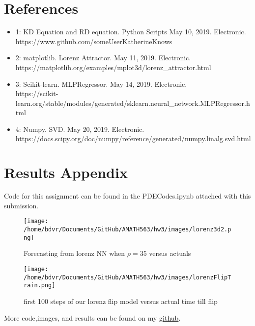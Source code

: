 \documentclass[12pt]{article}
\begin{document}
	\section{References}
	\begin{itemize}
		\item 1: KD Equation and RD equation. Python Scripts May 10, 2019. Electronic. \\
		https://www.github.com/someUserKatherineKnows
		\item 2: matplotlib. Lorenz Attractor. May 11, 2019. Electronic.\\ 
		https://matplotlib.org/examples/mplot3d/lorenz\_attractor.html
		\item 3: Scikit-learn. MLPRegressor. May 14, 2019. Electronic.\\  https://scikit-learn.org/stable/modules/generated/sklearn.neural\_network.MLPRegressor.html
		\item 4: Numpy. SVD. May 20, 2019. Electronic.\\ https://docs.scipy.org/doc/numpy/reference/generated/numpy.linalg.svd.html
		
	\end{itemize}
	\section{Results Appendix}
	Code for this assignment can be found in the PDECodes.ipynb attached with this submission.
	
	\begin{figure}[H]
		\texttt{[image: /home/bdvr/Documents/GitHub/AMATH563/hw3/images/lorenz3d2.png]}
		\caption{Forecasting from lorenz NN when $\rho=35$ versus actuals}
	\end{figure}
	\begin{figure}[H]
		\texttt{[image: /home/bdvr/Documents/GitHub/AMATH563/hw3/images/lorenzFlipTrain.png]}
		\caption{first 100 steps of our lorenz flip model versus actual time till flip}
	\end{figure}
	
	More code,images, and results can be found on my \href{https://github.com/bogyshi/AMATH563}{github}. 
	
\end{document}
